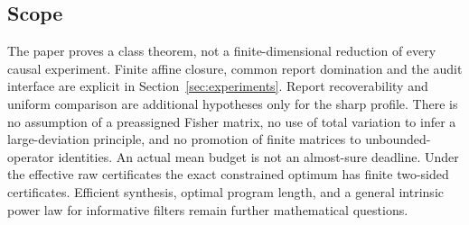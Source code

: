 \subsection*{Scope}
The paper proves a class theorem, not a finite-dimensional reduction of every causal experiment. Finite affine closure, common report domination and the audit interface are explicit in Section~\ref{sec:experiments}. Report recoverability and uniform comparison are additional hypotheses only for the sharp profile. There is no assumption of a preassigned Fisher matrix, no use of total variation to infer a large-deviation principle, and no promotion of finite matrices to unbounded-operator identities. An actual mean budget is not an almost-sure deadline. Under the effective raw certificates the exact constrained optimum has finite two-sided certificates. Efficient synthesis, optimal program length, and a general intrinsic power law for informative filters remain further mathematical questions.
